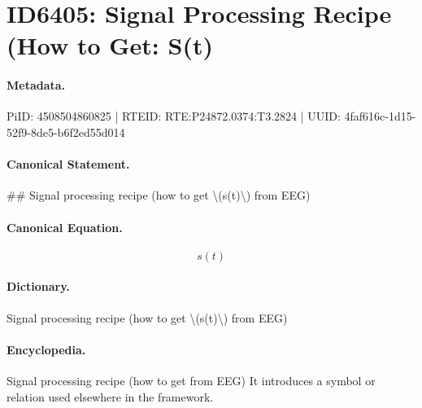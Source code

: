 \section*{ID6405: Signal Processing Recipe (How to Get: S(t)}
\paragraph{Metadata.}
PiID: 4508504860825 | RTEID: RTE:P24872.0374:T3.2824 | UUID: 4faf616c-1d15-52f9-8de5-b6f2ed55d014

\paragraph{Canonical Statement.}
\#\# Signal processing recipe (how to get \textbackslash{}(s(t)\textbackslash{}) from EEG)

\paragraph{Canonical Equation.}
\[
s(t)
\]

\paragraph{Dictionary.}
Signal processing recipe (how to get \textbackslash{}(s(t)\textbackslash{}) from EEG)

\paragraph{Encyclopedia.}
Signal processing recipe (how to get from EEG) It introduces a symbol or relation used elsewhere in the framework.
